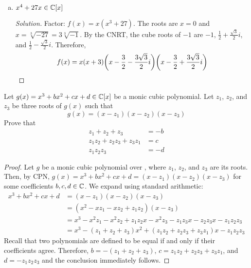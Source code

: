 \begin{enumerate}[(a)]
\begin{proof}[Solution]
          The discriminant of this quadratic is positive
          and it has roots $-\frac32 \pm \frac{\sqrt{5}}{2}$.
          Therefore, $f(x) = (x+1)(3x+1)(x-\frac32+\frac{\sqrt{5}}{2})(x-\frac32-\frac{\sqrt{5}}{2})$.
        \end{proof}
  \item $x^4 + 27x \in \mathbb{C}[x]$
        \begin{proof}[Solution]
          Factor: $f(x) = x(x^3 + 27)$.
          The roots are $x=0$ and $x=\sqrt[3]{-27}=3\sqrt[3]{-1}$.
          By the CNRT, the cube roots of $-1$ are $-1$,
          $\frac12+\frac{\sqrt{3}}2i$, and $\frac12-\frac{\sqrt{3}}2i$. Therefore,
          \[ f(x) = x(x+3)\qty(x-\frac{3}{2}-\frac{3\sqrt{3}}{2}i)\qty(x-\frac{3}{2}+\frac{3\sqrt{3}}{2}i) \qedhere \]
        \end{proof}
\end{enumerate}


\begin{recommended}
  Let $g(x)=x^3+bx^2+cx+d\in\mathbb{C}[x]$ be a monic cubic polynomial.
  Let $z_1$, $z_2$, and $z_3$ be three roots of $g(x)$ such that
  \[ g(x) = (x-z_1)(x-z_2)(x-z_3) \]
  Prove that \begin{align*}
    z_1 + z_2 + z_3          & = -b \\
    z_1z_2 + z_2z_3 + z_3z_1 & = c  \\
    z_1z_2z_3                & = -d
  \end{align*}
\end{recommended}
\begin{proof}
  Let $g$ be a monic cubic polynomial over \C, where $z_1$, $z_2$, and $z_3$ are its roots.
  Then, by CPN, $g(x) = x^3 + bx^2 + cx + d = (x-z_1)(x-z_2)(x-z_3)$ for some coefficients $b,c,d\in\mathbb{C}$.
  We expand using standard arithmetic:
  \begin{align*}
    x^3 + bx^2 + cx + d & = (x-z_1)(x-z_2)(x-z_3)                                                    \\
                        & = (x^2 - xz_1 - xz_2 + z_1z_2)(x-z_3)                                      \\
                        & = x^3 - x^2z_1 - x^2z_2 + z_1z_2x - x^2z_3 - z_1z_3x - z_2z_3x - z_1z_2z_3 \\
                        & = x^3 - (z_1 + z_2 + z_3)x^2 + (z_1z_2 + z_2z_3 + z_3z_1)x - z_1z_2z_3
  \end{align*}
  Recall that two polynomials are defined to be equal if and only if their coefficients agree.
  Therefore, $b = -(z_1+z_2+z_3)$, $c = z_1z_2 + z_2z_3 + z_3z_1$, and $d = -z_1z_2z_3$
  and the conclusion immediately follows.
\end{proof}


